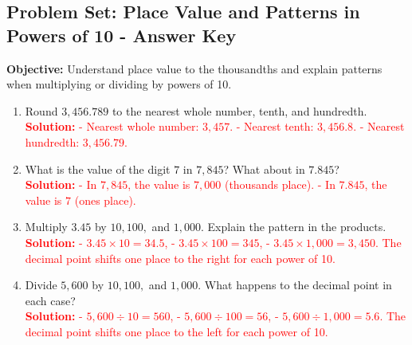 \documentclass[12pt]{article}
\title{}
\date{}
\begin{document}
\subsection*{Problem Set: Place Value and Patterns in Powers of 10 - Answer Key}
\onehalfspacing

\begin{tcolorbox}[colframe=black!40, colback=gray!5, 
coltitle=black, colbacktitle=black!20, fonttitle=\bfseries\Large, 
title=Learning Objective, halign title=center, left=5pt, right=5pt, top=5pt, bottom=15pt]
\textbf{Objective:} Understand place value to the thousandths and explain patterns when multiplying or dividing by powers of 10.
\end{tcolorbox}

\begin{tcolorbox}[colframe=black!60, colback=white, 
coltitle=black, colbacktitle=black!15, fonttitle=\bfseries\Large, 
title=Exercises, halign title=center, left=10pt, right=10pt, top=10pt, bottom=60pt]
\begin{enumerate}[itemsep=2em]
    \item Round \( 3,456.789 \) to the nearest whole number, tenth, and hundredth.\\
    \textcolor{red}{\textbf{Solution:} 
    - Nearest whole number: \( 3,457 \). 
    - Nearest tenth: \( 3,456.8 \). 
    - Nearest hundredth: \( 3,456.79 \).}

    \item What is the value of the digit \( 7 \) in \( 7,845 \)? What about in \( 7.845 \)?\\
    \textcolor{red}{\textbf{Solution:} 
    - In \( 7,845 \), the value is \( 7,000 \) (thousands place). 
    - In \( 7.845 \), the value is \( 7 \) (ones place).}

    \item Multiply \( 3.45 \) by \( 10, 100, \) and \( 1,000 \). Explain the pattern in the products.\\
    \textcolor{red}{\textbf{Solution:} 
    - \( 3.45 \times 10 = 34.5 \), 
    - \( 3.45 \times 100 = 345 \), 
    - \( 3.45 \times 1,000 = 3,450 \). 
    The decimal point shifts one place to the right for each power of 10.}

    \item Divide \( 5,600 \) by \( 10, 100, \) and \( 1,000 \). What happens to the decimal point in each case?\\
    \textcolor{red}{\textbf{Solution:} 
    - \( 5,600 \div 10 = 560 \), 
    - \( 5,600 \div 100 = 56 \), 
    - \( 5,600 \div 1,000 = 5.6 \). 
    The decimal point shifts one place to the left for each power of 10.}


\end{enumerate}
\end{tcolorbox}
\end{document}
